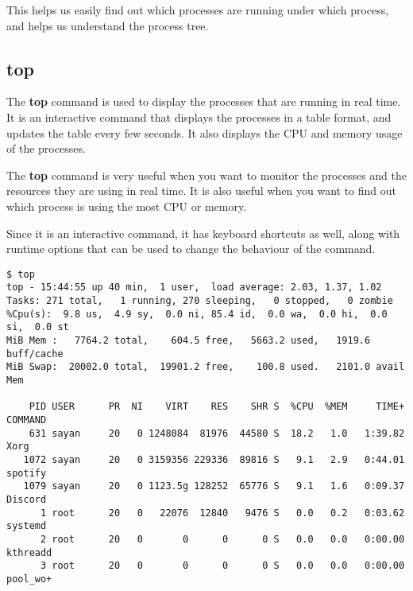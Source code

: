 This helps us easily find out which processes are running under which process,
and helps us understand the process tree.

\subsection{top}

The \textbf{top} command is used to display the processes that are running
in real time. It is an interactive command that displays the processes in
a table format, and updates the table every few seconds. It also displays
the CPU and memory usage of the processes.

The \textbf{top} command is very useful when you want to monitor the processes
and the resources they are using in real time. It is also useful when you
want to find out which process is using the most CPU or memory.

Since it is an interactive command, it has keyboard shortcuts as well, along
with runtime options that can be used to change the behaviour of the command.


\begin{lstlisting}
$ top
top - 15:44:55 up 40 min,  1 user,  load average: 2.03, 1.37, 1.02
Tasks: 271 total,   1 running, 270 sleeping,   0 stopped,   0 zombie
%Cpu(s):  9.8 us,  4.9 sy,  0.0 ni, 85.4 id,  0.0 wa,  0.0 hi,  0.0 si,  0.0 st
MiB Mem :   7764.2 total,    604.5 free,   5663.2 used,   1919.6 buff/cache
MiB Swap:  20002.0 total,  19901.2 free,    100.8 used.   2101.0 avail Mem

    PID USER      PR  NI    VIRT    RES    SHR S  %CPU  %MEM     TIME+ COMMAND
    631 sayan     20   0 1248084  81976  44580 S  18.2   1.0   1:39.82 Xorg
   1072 sayan     20   0 3159356 229336  89816 S   9.1   2.9   0:44.01 spotify
   1079 sayan     20   0 1123.5g 128252  65776 S   9.1   1.6   0:09.37 Discord
      1 root      20   0   22076  12840   9476 S   0.0   0.2   0:03.62 systemd
      2 root      20   0       0      0      0 S   0.0   0.0   0:00.00 kthreadd
      3 root      20   0       0      0      0 S   0.0   0.0   0:00.00 pool_wo+
\end{lstlisting}


